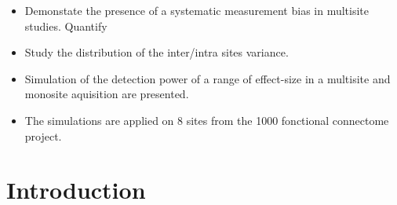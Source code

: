 \documentclass[authoryear]{elsarticle}
\begin{document}
\begin{itemize}
\item Demonstate the presence of a systematic measurement bias in multisite studies. Quantify
\item Study the distribution of the inter/intra sites variance.
\item Simulation of the detection power of a range of effect-size in a multisite and monosite aquisition are presented.
\item The simulations are applied on 8 sites from the 1000 fonctional connectome project.
\end{itemize}

\section{Introduction}

\end{document}
